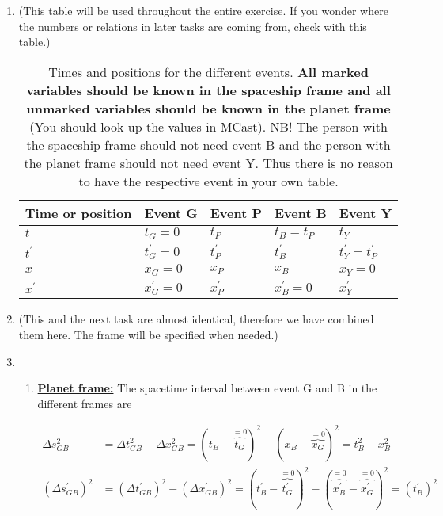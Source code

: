 \documentclass[a4paper,10pt,english]{article}
\begin{document}
\begin{enumerate}

\item (This table will be used throughout the entire exercise. If you wonder where the numbers or relations in later tasks are coming from, check with this table.)

\begin{table}[H]
  \begin{center}
    \begin{tabular}{| l | l | l | l | l |}
   	\hline
	 Time or position & Event G & Event P & Event B & Event Y\\ \hline
	 $t$ & $t_{G}=0$ & $t_{P}$ & $t_{B}=t_{P}$ & $t_{Y}$\\ \hline
	 $t^{\prime}$ & $t^{\prime}_{G}=0$ & $t_{P}^{\prime}$ & $t_{B}^{\prime}$ & $t^{\prime}_{Y}=t^{\prime}_{P}$\\ \hline
	 $x$ & $x_{G}=0$ & $x_{P}$ & $x_{B}$ & $x_{Y}=0$\\ \hline
	 $x^{\prime}$ & $x^{\prime}_{G}=0$ & $x_{P}^{\prime}$ & $x_{B}^{\prime}=0$ & $x^{\prime}_{Y}$\\ \hline
	\end{tabular}
    \caption{Times and positions for the different events. \textbf{All marked variables should be known in the spaceship frame and all unmarked variables should be known in the planet frame} (You should look up the values in MCast). NB! The person with the spaceship frame should not need event B and the person with the planet frame should not need event Y. Thus there is no reason to have the respective event in your own table.}
    \label{tabel:ex_2A_6}
  \end{center}
\end{table}
\FloatBarrier

\item (This and the next task are almost identical, therefore we have combined them here. The frame will be specified when needed.)
\item 
\begin{enumerate}

\item \underline{\bf{Planet frame:}} The spacetime interval between event G and B in the different frames are

\begin{align*}
\Delta s_{GB}^2&=\Delta t_{GB}^2-\Delta x_{GB}^2=(t_{B}-\overbrace{t_{G}}^{=0})^2-(x_{B}-\overbrace{x_{G}}^{=0})^2=t_{B}^2-x_{B}^2\\
(\Delta s_{GB}^{\prime})^2&=(\Delta t_{GB}^{\prime})^2-(\Delta x_{GB}^{\prime})^2=(t_{B}^{\prime}-\overbrace{t^{\prime}_{G}}^{=0})^2-(\overbrace{x_{B}^{\prime}}^{=0}-\overbrace{x^{\prime}_{G}}^{=0})^2=(t_{B}^{\prime})^2
\end{align*}


\end{enumerate}
\end{enumerate}
\end{document}

